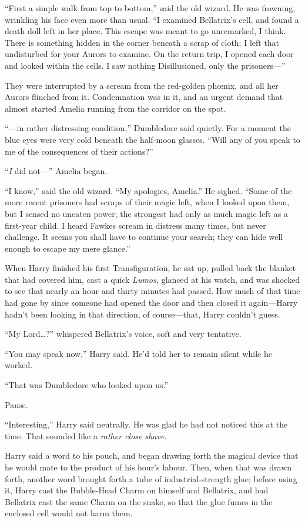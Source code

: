 “First a simple walk from top to bottom,” said the old wizard. He was frowning, wrinkling his face even more than usual. “I examined Bellatrix’s cell, and found a death doll left in her place. This escape was meant to go unremarked, I think. There is something hidden in the corner beneath a scrap of cloth; I left that undisturbed for your Aurors to examine. On the return trip, I opened each door and looked within the cells. I saw nothing Disillusioned, only the prisoners—”

They were interrupted by a scream from the red-golden phœnix, and all her Aurors flinched from it. Condemnation was in it, and an urgent demand that almost started Amelia running from the corridor on the spot.

“—in rather distressing condition,” Dumbledore said quietly. For a moment the blue eyes were very cold beneath the half-moon glasses. “Will any of you speak to me of the consequences of their actions?”

“\emph{I} did not—” Amelia began.

“I know,” said the old wizard. “My apologies, Amelia.” He sighed. “Some of the more recent prisoners had scraps of their magic left, when I looked upon them, but I sensed no uneaten power; the strongest had only as much magic left as a first-year child. I heard Fawkes scream in distress many times, but never challenge. It seems you shall have to continue your search; they can hide well enough to escape my mere glance.”

\later

When Harry finished his first Transfiguration, he sat up, pulled back the blanket that had covered him, cast a quick \emph{Lumos,} glanced at his watch, and was shocked to see that nearly an hour and thirty minutes had passed. How much of that time had gone by since someone had opened the door and then closed it again—Harry hadn’t been looking in that direction, of course—that, Harry couldn’t guess.

“My Lord…?” whispered Bellatrix’s voice, soft and very tentative.

“You may speak now,” Harry said. He’d told her to remain silent while he worked.

“That was Dumbledore who looked upon us.”

Pause.

“Interesting,” Harry said neutrally. He was glad he had not noticed this at the time. That sounded like a \emph{rather close shave}.

Harry said a word to his pouch, and began drawing forth the magical device that he would mate to the product of his hour’s labour. Then, when that was drawn forth, another word brought forth a tube of industrial-strength glue; before using it, Harry cast the Bubble-Head Charm on himself and Bellatrix, and had Bellatrix cast the same Charm on the snake, so that the glue fumes in the enclosed cell would not harm them.

